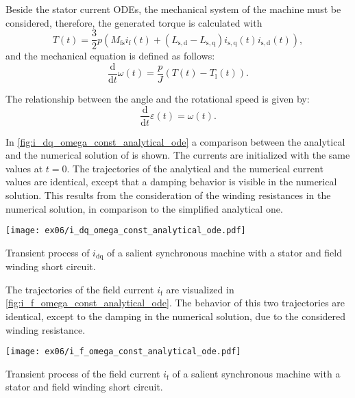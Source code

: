 \begin{solutionblock}
    Beside the stator current ODEs, the mechanical system of the machine must be considered, therefore, the generated torque is calculated with
    \begin{equation}
        T(t) = \frac{3}{2}p\left(M_{\mathrm{fs}}i_{\mathrm{f}}(t) + \left(L_{\mathrm{s,d}}-L_{\mathrm{s,q}}\right)i_{\mathrm{s,q}}(t)i_{\mathrm{s,d}}(t)\right),
    \end{equation}
    and the mechanical equation is defined as follows:
    \begin{equation}
        \frac{\mathrm{d}}{\mathrm{d}t} \omega(t) = \frac{p}{J} \left(T(t)-T_{\mathrm{l}}(t)\right).
    \end{equation}

    The relationship between the angle and the rotational speed is given by:
    \begin{equation}
        \frac{\mathrm{d}}{\mathrm{d}t} \varepsilon(t) = \omega(t).
    \end{equation}

    In \autoref{fig:i_dq_omega_const_analytical_ode} a comparison between the analytical and the numerical solution of is shown. The currents are initialized with the same values at $t=0$. The trajectories of the analytical and the numerical current values are identical, except that a damping behavior is visible in the numerical solution. This results from the consideration of the winding resistances in the numerical solution, in comparison to the simplified analytical one.
    \begin{solutionfigure}[h]
        \centering
        \texttt{[image: ex06/i\_dq\_omega\_const\_analytical\_ode.pdf]}
        \caption{Transient process of $i_{\mathrm{dq}}$ of a salient synchronous machine with a stator and field winding short circuit.}
        \label{fig:i_dq_omega_const_analytical_ode}
    \end{solutionfigure}

    The trajectories of the field current $i_{\mathrm{f}}$ are visualized in \autoref{fig:i_f_omega_const_analytical_ode}. The behavior of this two trajectories are identical, except to the damping in the numerical solution, due to the considered winding resistance.
    \begin{solutionfigure}[h]
        \centering
        \texttt{[image: ex06/i\_f\_omega\_const\_analytical\_ode.pdf]}
        \caption{Transient process of the field current $i_{\mathrm{f}}$ of a salient synchronous machine with a stator and field winding short circuit.}
        \label{fig:i_f_omega_const_analytical_ode}
    \end{solutionfigure}

\end{solutionblock}

